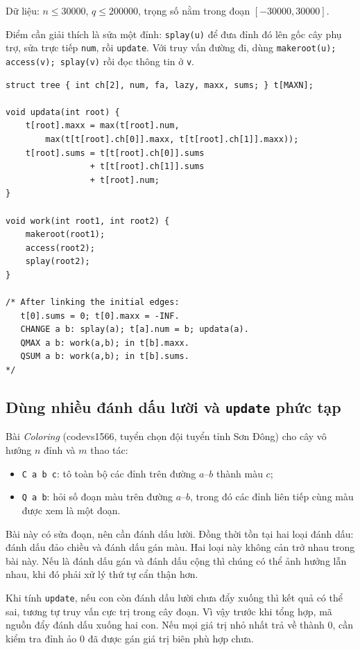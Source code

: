 \documentclass[11pt]{article}
\begin{document}
Dữ liệu: $n\le 30000$, $q\le 200000$, trọng số nằm trong đoạn
$[-30000,30000]$.

Điểm cần giải thích là sửa một đỉnh: \texttt{splay(u)} để đưa đỉnh đó lên gốc
cây phụ trợ, sửa trực tiếp \texttt{num}, rồi \texttt{update}.  Với truy vấn
đường đi, dùng \texttt{makeroot(u); access(v); splay(v)} rồi đọc thông tin ở
\texttt{v}.

\begingroup
\small
\begin{verbatim}
struct tree { int ch[2], num, fa, lazy, maxx, sums; } t[MAXN];

void updata(int root) {
    t[root].maxx = max(t[root].num,
        max(t[t[root].ch[0]].maxx, t[t[root].ch[1]].maxx));
    t[root].sums = t[t[root].ch[0]].sums
                 + t[t[root].ch[1]].sums
                 + t[root].num;
}

void work(int root1, int root2) {
    makeroot(root1);
    access(root2);
    splay(root2);
}

/* After linking the initial edges:
   t[0].sums = 0; t[0].maxx = -INF.
   CHANGE a b: splay(a); t[a].num = b; updata(a).
   QMAX a b: work(a,b); in t[b].maxx.
   QSUM a b: work(a,b); in t[b].sums.
*/
\end{verbatim}
\endgroup

\subsection{Dùng nhiều đánh dấu lười và \texttt{update} phức tạp}

Bài \textit{Coloring} (codevs1566, tuyển chọn đội tuyển tỉnh Sơn Đông) cho cây
vô hướng $n$ đỉnh và $m$ thao tác:
\begin{itemize}
  \item \texttt{C a b c}: tô toàn bộ các đỉnh trên đường $a$--$b$ thành màu
  $c$;
  \item \texttt{Q a b}: hỏi số đoạn màu trên đường $a$--$b$, trong đó các đỉnh
  liên tiếp cùng màu được xem là một đoạn.
\end{itemize}

Bài này có sửa đoạn, nên cần đánh dấu lười.  Đồng thời tồn tại hai loại đánh
dấu: đánh dấu đảo chiều và đánh dấu gán màu.  Hai loại này không cản trở nhau
trong bài này.  Nếu là đánh dấu gán và đánh dấu cộng thì chúng có thể ảnh
hưởng lẫn nhau, khi đó phải xử lý thứ tự cẩn thận hơn.

Khi tính \texttt{update}, nếu con còn đánh dấu lười chưa đẩy xuống thì kết quả
có thể sai, tương tự truy vấn cực trị trong cây đoạn.  Vì vậy trước khi tổng
hợp, mã nguồn đẩy đánh dấu xuống hai con.  Nếu mọi giá trị nhỏ nhất trả về
thành $0$, cần kiểm tra đỉnh ảo $0$ đã được gán giá trị biên phù hợp chưa.
\end{document}
